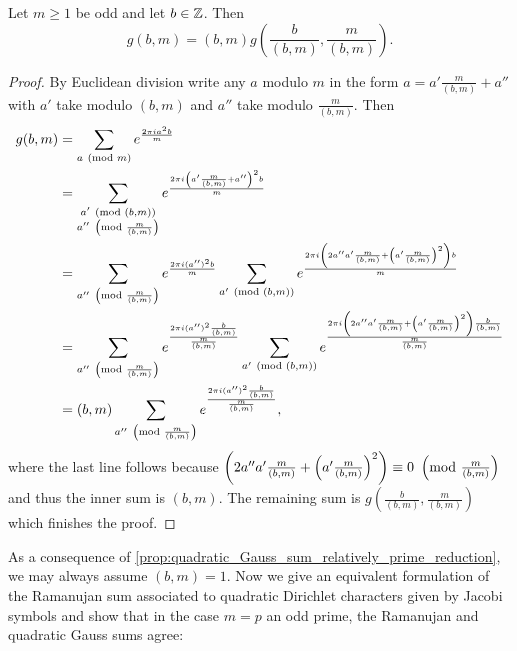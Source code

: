       \begin{proposition}\label{prop:quadratic_Gauss_sum_relatively_prime_reduction}
        Let $m \ge 1$ be odd and let $b \in \mathbb{Z}$. Then
        \[
          g(b,m) = (b,m)g\left(\frac{b}{(b,m)},\frac{m}{(b,m)}\right).
        \]
      \end{proposition}
      \begin{proof}
        By Euclidean division write any $a$ modulo $m$ in the form $a = a'\frac{m}{(b,m)}+a''$ with $a'$ take modulo $(b,m)$ and $a''$ take modulo $\frac{m}{(b,m)}$. Then
        \begin{align*}
          g(b,m) &= \sum_{a \ \left(\text{mod }m\right)}e^{\frac{2\pi ia^{2}b}{m}} \\
          &= \sum_{\substack{a' \ \left(\text{mod }(b,m)\right) \\ a'' \ \left(\text{mod }\frac{m}{(b,m)}\right)}}e^{\frac{2\pi i\left(a'\frac{m}{(b,m)}+a''\right)^{2}b}{m}} \\
          &= \sum_{a'' \ \left(\text{mod }\frac{m}{(b,m)}\right)}e^{\frac{2\pi i(a'')^{2}b}{m}}\sum_{a' \ \left(\text{mod }(b,m)\right)}e^{\frac{2\pi i\left(2a''a'\frac{m}{(b,m)}+\left(a'\frac{m}{(b,m)}\right)^{2}\right)b}{m}} \\
          &= \sum_{a'' \ \left(\text{mod }\frac{m}{(b,m)}\right)}e^{\frac{2\pi i(a'')^{2}\frac{b}{(b,m)}}{\frac{m}{(b,m)}}}\sum_{a' \ \left(\text{mod }(b,m)\right)}e^{\frac{2\pi i\left(2a''a'\frac{m}{(b,m)}+\left(a'\frac{m}{(b,m)}\right)^{2}\right)\frac{b}{(b,m)}}{\frac{m}{(b,m)}}} \\
          &= (b,m)\sum_{a'' \ \left(\text{mod }\frac{m}{(b,m)}\right)}e^{\frac{2\pi i(a'')^{2}\frac{b}{(b,m)}}{\frac{m}{(b,m)}}},
        \end{align*}
        where the last line follows because $\left(2a''a'\frac{m}{(b,m)}+\left(a'\frac{m}{(b,m)}\right)^{2}\right) \equiv 0 \ \left(\text{mod }\frac{m}{(b,m)}\right)$ and thus the inner sum is $(b,m)$. The remaining sum is $g\left(\frac{b}{(b,m)},\frac{m}{(b,m)}\right)$ which finishes the proof.
      \end{proof}

      As a consequence of \cref{prop:quadratic_Gauss_sum_relatively_prime_reduction}, we may always assume $(b,m) = 1$. Now we give an equivalent formulation of the Ramanujan sum associated to quadratic Dirichlet characters given by Jacobi symbols and show that in the case $m = p$ an odd prime, the Ramanujan and quadratic Gauss sums agree:

